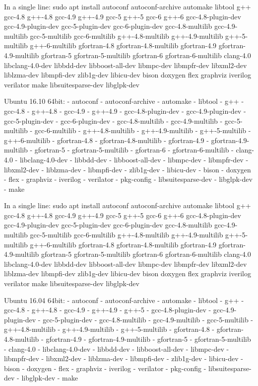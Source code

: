 \begin{DoxyVerbInclude}
In a single line:
sudo apt install autoconf autoconf-archive automake libtool g++ gcc-4.8 g++-4.8 gcc-4.9 g++-4.9 gcc-5 g++-5 gcc-6 g++-6 gcc-4.8-plugin-dev gcc-4.9-plugin-dev gcc-5-plugin-dev gcc-6-plugin-dev gcc-4.8-multilib gcc-4.9-multilib gcc-5-multilib gcc-6-multilib g++-4.8-multilib g++-4.9-multilib g++-5-multilib g++-6-multilib gfortran-4.8 gfortran-4.8-multilib gfortran-4.9 gfortran-4.9-multilib gfortran-5 gfortran-5-multilib gfortran-6 gfortran-6-multilib clang-4.0 libclang-4.0-dev libbdd-dev libboost-all-dev libmpc-dev libmpfr-dev libxml2-dev liblzma-dev libmpfi-dev zlib1g-dev libicu-dev bison doxygen flex graphviz iverilog verilator make libsuitesparse-dev libglpk-dev

Ubuntu 16.10 64bit:
- autoconf
- autoconf-archive
- automake
- libtool
- g++
- gcc-4.8
- g++-4.8
- gcc-4.9
- g++-4.9
- gcc-4.8-plugin-dev
- gcc-4.9-plugin-dev
- gcc-5-plugin-dev
- gcc-6-plugin-dev
- gcc-4.8-multilib
- gcc-4.9-multilib
- gcc-5-multilib
- gcc-6-multilib
- g++-4.8-multilib
- g++-4.9-multilib
- g++-5-multilib
- g++-6-multilib
- gfortran-4.8
- gfortran-4.8-multilib 
- gfortran-4.9
- gfortran-4.9-multilib
- gfortran-5 
- gfortran-5-multilib
- gfortran-6 
- gfortran-6-multilib
- clang-4.0
- libclang-4.0-dev
- libbdd-dev
- libboost-all-dev
- libmpc-dev
- libmpfr-dev
- libxml2-dev
- liblzma-dev
- libmpfi-dev
- zlib1g-dev
- libicu-dev
- bison
- doxygen
- flex
- graphviz
- iverilog
- verilator
- pkg-config
- libsuitesparse-dev
- libglpk-dev
- make


In a single line:
sudo apt install autoconf autoconf-archive automake libtool g++ gcc-4.8 g++-4.8 gcc-4.9 g++-4.9 gcc-5 g++-5 gcc-6 g++-6 gcc-4.8-plugin-dev gcc-4.9-plugin-dev gcc-5-plugin-dev gcc-6-plugin-dev gcc-4.8-multilib gcc-4.9-multilib gcc-5-multilib gcc-6-multilib g++-4.8-multilib g++-4.9-multilib g++-5-multilib g++-6-multilib gfortran-4.8 gfortran-4.8-multilib gfortran-4.9 gfortran-4.9-multilib gfortran-5 gfortran-5-multilib gfortran-6 gfortran-6-multilib clang-4.0 libclang-4.0-dev libbdd-dev libboost-all-dev libmpc-dev libmpfr-dev libxml2-dev liblzma-dev libmpfi-dev zlib1g-dev libicu-dev bison doxygen flex graphviz iverilog verilator make libsuitesparse-dev libglpk-dev

Ubuntu 16.04 64bit:
- autoconf
- autoconf-archive
- automake
- libtool
- g++
- gcc-4.8
- g++-4.8
- gcc-4.9
- g++-4.9
- g++-5
- gcc-4.8-plugin-dev
- gcc-4.9-plugin-dev
- gcc-5-plugin-dev
- gcc-4.8-multilib
- gcc-4.9-multilib
- gcc-5-multilib
- g++-4.8-multilib
- g++-4.9-multilib
- g++-5-multilib
- gfortran-4.8
- gfortran-4.8-multilib 
- gfortran-4.9
- gfortran-4.9-multilib
- gfortran-5 
- gfortran-5-multilib
- clang-4.0
- libclang-4.0-dev
- libbdd-dev
- libboost-all-dev
- libmpc-dev
- libmpfr-dev
- libxml2-dev
- liblzma-dev
- libmpfi-dev
- zlib1g-dev
- libicu-dev
- bison
- doxygen
- flex
- graphviz
- iverilog
- verilator
- pkg-config
- libsuitesparse-dev
- libglpk-dev
- make



\end{DoxyVerbInclude}
